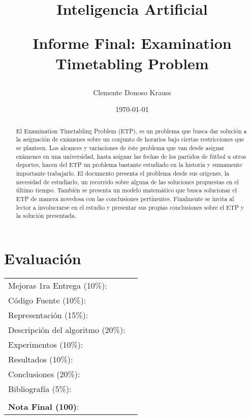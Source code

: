 \title{Inteligencia Artificial \\ \begin{Large}Informe Final: Examination Timetabling Problem\end{Large}}
\author{Clemente Donoso Krauss}
\date{\today}
\maketitle


\section*{Evaluaci\'on}

\begin{tabular}{ll}
Mejoras 1ra Entrega (10\%): &  \underline{\hspace{2cm}}\\
C\'odigo Fuente (10\%): &  \underline{\hspace{2cm}}\\
Representaci\'on (15\%):  & \underline{\hspace{2cm}} \\
Descripci\'on del algoritmo (20\%):  & \underline{\hspace{2cm}} \\
Experimentos (10\%):  & \underline{\hspace{2cm}} \\
Resultados (10\%):  & \underline{\hspace{2cm}} \\
Conclusiones (20\%): &  \underline{\hspace{2cm}}\\
Bibliograf\'ia (5\%): & \underline{\hspace{2cm}}\\
 &  \\
\textbf{Nota Final (100)}:   & \underline{\hspace{2cm}}
\end{tabular}
\vspace{2cm}


\begin{abstract}
El Examination Timetabling Problem (ETP), es un problema que busca dar solución a la asignación de exámenes sobre un conjunto de horarios bajo ciertas restricciones que se planteen. Los alcances y variaciones de éste problema que van desde asignar exámenes en una universidad, hasta asignar las fechas de los partidos de fútbol u otros deportes, hacen del ETP un problema bastante estudiado en la historia y sumamente importante trabajarlo. El documento presenta el problema desde sus orígenes, la necesidad de estudiarlo, un recorrido sobre alguna de las soluciones propuestas en el último tiempo. También se presenta un modelo matemático que busca solucionar el ETP de manera novedosa con las conclusiones pertinentes. Finalmente se invita al lector a involucrarse en el estudio y presentar sus propias conclusiones sobre el ETP y la solución presentada.
\end{abstract}

